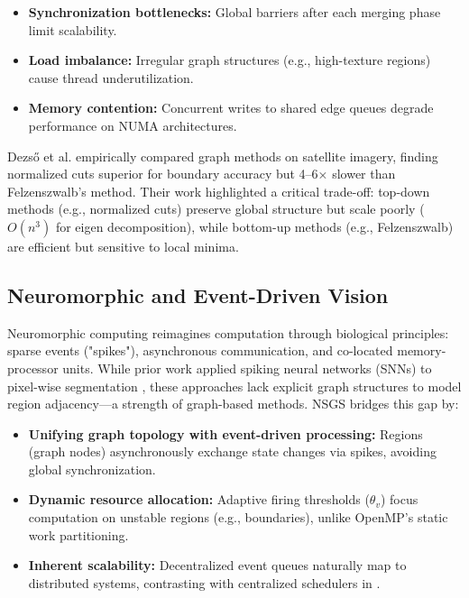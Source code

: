 \documentclass[conference]{IEEEtran}
\begin{document}
\begin{itemize}
    \item \textbf{Synchronization bottlenecks:} Global barriers after each merging phase limit scalability.
    \item \textbf{Load imbalance:} Irregular graph structures (e.g., high-texture regions) cause thread underutilization.
    \item \textbf{Memory contention:} Concurrent writes to shared edge queues degrade performance on NUMA architectures.
\end{itemize}

Dezső et al. \cite{Dezso2012} empirically compared graph methods on satellite imagery, finding normalized cuts \cite{Shi2000} superior for boundary accuracy but 4–6× slower than Felzenszwalb's method. Their work highlighted a critical trade-off: top-down methods (e.g., normalized cuts) preserve global structure but scale poorly ($O(n^3)$ for eigen decomposition), while bottom-up methods (e.g., Felzenszwalb) are efficient but sensitive to local minima.

\subsection{Neuromorphic and Event-Driven Vision}
Neuromorphic computing reimagines computation through biological principles: sparse events ("spikes"), asynchronous communication, and co-located memory-processor units. While prior work applied spiking neural networks (SNNs) to pixel-wise segmentation \cite{Maass1997, Ha2016, Bartolozzi2022}, these approaches lack explicit graph structures to model region adjacency—a strength of graph-based methods. NSGS bridges this gap by:

\begin{itemize}
    \item \textbf{Unifying graph topology with event-driven processing:} Regions (graph nodes) asynchronously exchange state changes via spikes, avoiding global synchronization.
    \item \textbf{Dynamic resource allocation:} Adaptive firing thresholds ($\theta_v$) focus computation on unstable regions (e.g., boundaries), unlike OpenMP's static work partitioning.
    \item \textbf{Inherent scalability:} Decentralized event queues naturally map to distributed systems, contrasting with centralized schedulers in \cite{Saglam2016}.
\end{itemize}
\end{document}
